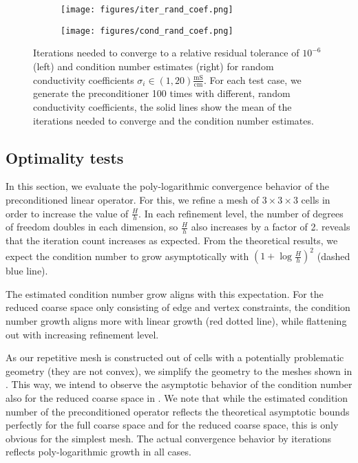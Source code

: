 \begin{figure}
    \centering
    \begin{subfigure}[b]{0.4\textwidth}
        \texttt{[image: figures/iter\_rand\_coef.png]}
    \end{subfigure}
    \begin{subfigure}[b]{0.4\textwidth}
        \texttt{[image: figures/cond\_rand\_coef.png]}
    \end{subfigure}
    \caption{Iterations needed to converge to a relative residual tolerance of $10^{-6}$ (left) and condition number estimates (right) for random conductivity coefficients \newline $\sigma_i \in (1, 20) \frac{\text{mS}}{\text{cm}}$. For each test case, we generate the preconditioner 100 times with different, random conductivity coefficients, the solid lines show the mean of the iterations needed to converge and the condition number estimates.}
    \label{fig:rand_sigma}
\end{figure}

\subsection{Optimality tests}
In this section, we evaluate the poly-logarithmic convergence behavior of the preconditioned linear operator. For this, we refine a mesh of $3\times 3\times 3$ cells in order to increase the value of $\frac{H}{h}$. In each refinement level, the number of degrees of freedom doubles in each dimension, so $\frac{H}{h}$ also increases by a factor of 2.  reveals that the iteration count increases as expected. From the theoretical results, we expect the condition number to grow asymptotically with $(1 + \log\frac{H}{h})^2$ (dashed blue line).

The estimated condition number grow aligns with this expectation. For the reduced coarse space only consisting of edge and vertex constraints, the condition number growth aligns more with linear growth (red dotted line), while flattening out with increasing refinement level.

As our repetitive mesh is constructed out of cells with a potentially problematic geometry (they are not convex), we simplify the geometry to the meshes shown in . This way, we intend to observe the asymptotic behavior of the condition number also for the reduced coarse space in . We note that while the estimated condition number of the preconditioned operator reflects the theoretical asymptotic bounds perfectly for the full coarse space and for the reduced coarse space, this is only obvious for the simplest mesh. The actual convergence behavior by iterations reflects poly-logarithmic growth in all cases.

